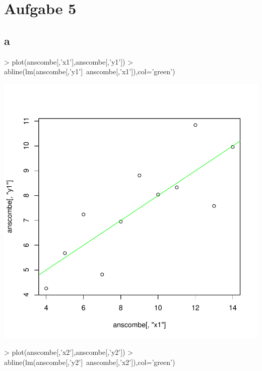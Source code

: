 

\section{Aufgabe 5}

\subsection{a}
\begin{Schunk}
\begin{Sinput}
> plot(anscombe[,'x1'],anscombe[,'y1'])
> abline(lm(anscombe[,'y1']~anscombe[,'x1']),col='green')
\end{Sinput}
\end{Schunk}
\includegraphics{sw11_5-001}
\begin{Schunk}
\begin{Sinput}
> plot(anscombe[,'x2'],anscombe[,'y2'])
> abline(lm(anscombe[,'y2']~anscombe[,'x2']),col='green')
\end{Sinput}
\end{Schunk}
